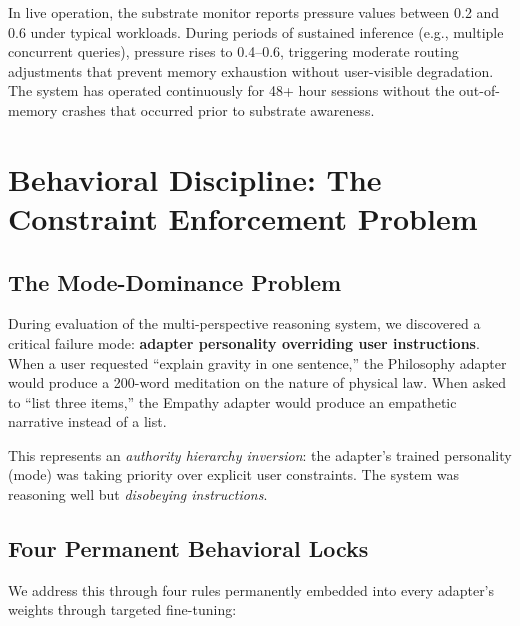 In live operation, the substrate monitor reports pressure values between 0.2
and 0.6 under typical workloads. During periods of sustained inference (e.g.,
multiple concurrent queries), pressure rises to 0.4--0.6, triggering moderate
routing adjustments that prevent memory exhaustion without user-visible
degradation. The system has operated continuously for 48+ hour sessions without
the out-of-memory crashes that occurred prior to substrate awareness.



\section{Behavioral Discipline: The Constraint Enforcement Problem}
\label{sec:behavioral}

\subsection{The Mode-Dominance Problem}

During evaluation of the multi-perspective reasoning system, we discovered a
critical failure mode: \textbf{adapter personality overriding user
instructions}. When a user requested ``explain gravity in one sentence,'' the
Philosophy adapter would produce a 200-word meditation on the nature of
physical law. When asked to ``list three items,'' the Empathy adapter would
produce an empathetic narrative instead of a list.

This represents an \emph{authority hierarchy inversion}: the adapter's trained
personality (mode) was taking priority over explicit user constraints. The
system was reasoning well but \emph{disobeying instructions}.

\subsection{Four Permanent Behavioral Locks}

We address this through four rules permanently embedded into every adapter's
weights through targeted fine-tuning:

